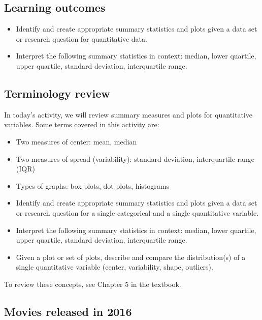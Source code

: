 \documentclass[
]{report}
\begin{document}

\hypertarget{learning-outcomes-5}{%
\subsection{Learning outcomes}\label{learning-outcomes-5}}

\begin{itemize}
\item
  Identify and create appropriate summary statistics and plots
  given a data set or research question for quantitative data.
\item
  Interpret the following summary statistics in context:
  median, lower quartile, upper quartile,
  standard deviation, interquartile range.
\end{itemize}

\hypertarget{terminology-review-5}{%
\subsection{Terminology review}\label{terminology-review-5}}

In today's activity, we will review summary measures and plots for quantitative variables. Some terms covered in this activity are:

\begin{itemize}
\item
  Two measures of center: mean, median
\item
  Two measures of spread (variability): standard deviation, interquartile range (IQR)
\item
  Types of graphs: box plots, dot plots, histograms
\item
  Identify and create appropriate summary statistics and plots given a data set or research question for a single categorical and a single quantitative variable.
\item
  Interpret the following summary statistics in context:
  median, lower quartile, upper quartile,
  standard deviation, interquartile range.
\item
  Given a plot or set of plots, describe and compare the distribution(s)
  of a single quantitative variable
  (center, variability, shape, outliers).
\end{itemize}

To review these concepts, see Chapter 5 in the textbook.

\hypertarget{movies-released-in-2016}{%
\subsection{Movies released in 2016}\label{movies-released-in-2016}}
\end{document}
